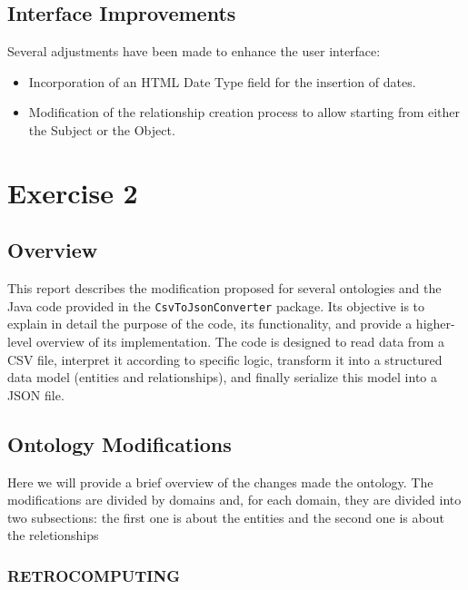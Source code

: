 \subsection{Interface Improvements}

Several adjustments have been made to enhance the user interface:

\begin{itemize}
    \item Incorporation of an HTML Date Type field for the insertion of dates.
    \item Modification of the relationship creation process to allow starting from either the Subject or the Object.
\end{itemize}


\section{Exercise 2}

\subsection{Overview}

This report describes the modification proposed for several ontologies and the Java code provided in the \texttt{CsvToJsonConverter} package. Its objective is to explain in detail the purpose of the code, its functionality, and provide a higher-level overview of its implementation. The code is designed to read data from a CSV file, interpret it according to specific logic, transform it into a structured data model (entities and relationships), and finally serialize this model into a JSON file.


\subsection{Ontology Modifications}


Here we will provide a brief overview of the changes made the ontology. The modifications are divided by domains and, for each domain, they are divided into two subsections: the first one is about the entities and the second one is about the reletionships
\subsubsection{RETROCOMPUTING}

